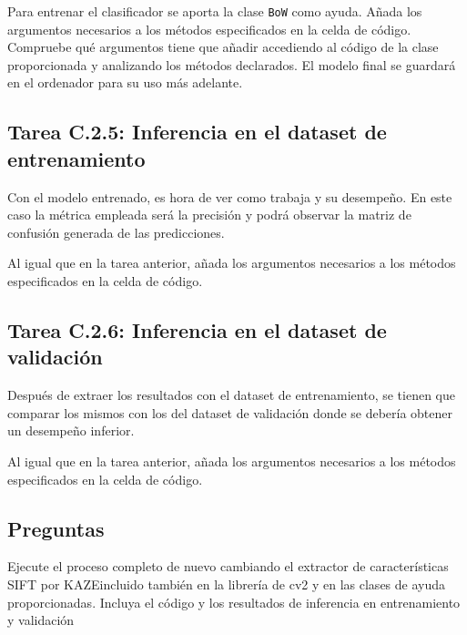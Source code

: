Para entrenar el clasificador se aporta la clase \texttt{BoW} como ayuda. Añada los argumentos necesarios a los métodos especificados en la celda de código. Compruebe qué argumentos tiene que añadir accediendo al código de la clase proporcionada y analizando los métodos declarados. El modelo final se guardará en el ordenador para su uso más adelante.

\subsection*{Tarea C.2.5: Inferencia en el dataset de entrenamiento}

Con el modelo entrenado, es hora de ver como trabaja y su desempeño. En este caso la métrica empleada será la precisión y podrá observar la matriz de confusión generada de las predicciones.

Al igual que en la tarea anterior, añada los argumentos necesarios a los métodos especificados en la celda de código.

\subsection*{Tarea C.2.6: Inferencia en el dataset de validación}

Después de extraer los resultados con el dataset de entrenamiento, se tienen que comparar los mismos con los del dataset de validación donde se debería obtener un desempeño inferior.

Al igual que en la tarea anterior, añada los argumentos necesarios a los métodos especificados en la celda de código.


\subsection*{Preguntas}

\vspace{5mm}
\begin{tcolorbox}[colback=gray!10, colframe=gray!30, coltitle=black, title=Pregunta C.2: Cambio de SIFT por KAZE, halign=left]
Ejecute el proceso completo de nuevo cambiando el extractor de características SIFT por KAZEincluido también en la librería de cv2 y en las clases de ayuda proporcionadas. Incluya el código y los resultados de inferencia en entrenamiento y validación
\end{tcolorbox}

